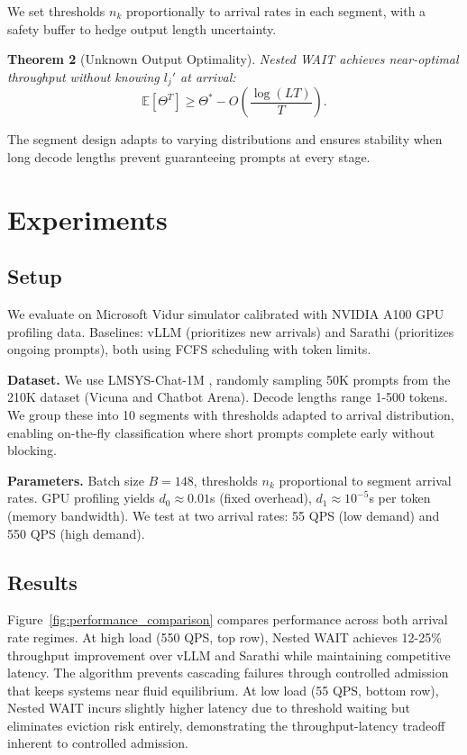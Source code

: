 We set thresholds $n_k$ proportionally to arrival rates in each segment, with a safety buffer to hedge output length uncertainty.

\textbf{Theorem 2} (Unknown Output Optimality). \textit{Nested WAIT achieves near-optimal throughput without knowing $l_j'$ at arrival:}
\begin{equation}
\mathbb{E}[\Theta^T] \geq \Theta^* - O\left(\frac{\log(LT)}{T}\right).
\end{equation}

The segment design adapts to varying distributions and ensures stability when long decode lengths prevent guaranteeing prompts at every stage.


\section{Experiments}

\subsection{Setup}

We evaluate on Microsoft Vidur simulator calibrated with NVIDIA A100 GPU profiling data. Baselines: vLLM \cite{kwon2023efficient} (prioritizes new arrivals) and Sarathi \cite{agrawal2023sarathi} (prioritizes ongoing prompts), both using FCFS scheduling with token limits.

\textbf{Dataset.} We use LMSYS-Chat-1M \cite{zheng2023lmsys}, randomly sampling 50K prompts from the 210K dataset (Vicuna and Chatbot Arena). Decode lengths range 1-500 tokens. We group these into 10 segments with thresholds adapted to arrival distribution, enabling on-the-fly classification where short prompts complete early without blocking.

\textbf{Parameters.} Batch size $B = 148$, thresholds $n_k$ proportional to segment arrival rates. GPU profiling yields $d_0 \approx 0.01$s (fixed overhead), $d_1 \approx 10^{-5}$s per token (memory bandwidth). We test at two arrival rates: 55 QPS (low demand) and 550 QPS (high demand).

\subsection{Results}

Figure~\ref{fig:performance_comparison} compares performance across both arrival rate regimes. At high load (550 QPS, top row), Nested WAIT achieves 12-25\% throughput improvement over vLLM and Sarathi while maintaining competitive latency. The algorithm prevents cascading failures through controlled admission that keeps systems near fluid equilibrium. At low load (55 QPS, bottom row), Nested WAIT incurs slightly higher latency due to threshold waiting but eliminates eviction risk entirely, demonstrating the throughput-latency tradeoff inherent to controlled admission.

